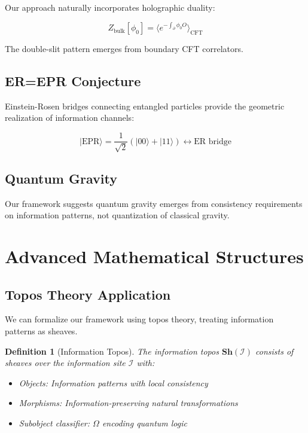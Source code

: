 \documentclass[12pt,a4paper]{article}
\newtheorem{definition}[theorem]{Definition}
\begin{document}
Our approach naturally incorporates holographic duality:

\begin{equation}
Z_{\text{bulk}}[\phi_0] = \langle e^{-\int_{\partial} \phi_0 O}\rangle_{\text{CFT}}
\end{equation}

The double-slit pattern emerges from boundary CFT correlators.

\subsection{ER=EPR Conjecture}

Einstein-Rosen bridges connecting entangled particles provide the geometric realization of information channels:

\begin{equation}
|\text{EPR}\rangle = \frac{1}{\sqrt{2}}(|00\rangle + |11\rangle) \leftrightarrow \text{ER bridge}
\end{equation}

\subsection{Quantum Gravity}

Our framework suggests quantum gravity emerges from consistency requirements on information patterns, not quantization of classical gravity.

\section{Advanced Mathematical Structures}

\subsection{Topos Theory Application}

We can formalize our framework using topos theory, treating information patterns as sheaves.

\begin{definition}[Information Topos]
The information topos $\mathbf{Sh}(\mathcal{I})$ consists of sheaves over the information site $\mathcal{I}$ with:
\begin{itemize}
\item Objects: Information patterns with local consistency
\item Morphisms: Information-preserving natural transformations
\item Subobject classifier: $\Omega$ encoding quantum logic
\end{itemize}
\end{definition}
\end{document}
